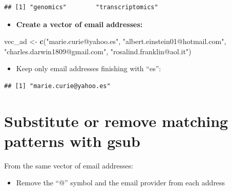 \documentclass[]{book}
\newenvironment{Shaded}{\begin{snugshade}}{\end{snugshade}}
\newcommand{\DataTypeTok}[1]{\textcolor[rgb]{0.13,0.29,0.53}{#1}}
\newcommand{\KeywordTok}[1]{\textcolor[rgb]{0.13,0.29,0.53}{\textbf{#1}}}
\newcommand{\NormalTok}[1]{#1}
\newcommand{\OtherTok}[1]{\textcolor[rgb]{0.56,0.35,0.01}{#1}}
\newcommand{\StringTok}[1]{\textcolor[rgb]{0.31,0.60,0.02}{#1}}
\providecommand{\tightlist}{%
  \setlength{\itemsep}{0pt}\setlength{\parskip}{0pt}}
\begin{document}
\begin{verbatim}
## [1] "genomics"        "transcriptomics"
\end{verbatim}

\begin{itemize}
\tightlist
\item
  \textbf{Create a vector of email addresses:}
\end{itemize}

\begin{Shaded}
\begin{Highlighting}[]
\NormalTok{vec_ad <-}\StringTok{ }\KeywordTok{c}\NormalTok{(}\StringTok{"marie.curie@yahoo.es"}\NormalTok{, }\StringTok{"albert.einstein01@hotmail.com"}\NormalTok{, }
    \StringTok{"charles.darwin1809@gmail.com"}\NormalTok{, }\StringTok{"rosalind.franklin@aol.it"}\NormalTok{)}
\end{Highlighting}
\end{Shaded}

\begin{itemize}
\tightlist
\item
  Keep only email addresses finishing with ``es'':
\end{itemize}

\begin{Shaded}
\end{Shaded}

\begin{verbatim}
## [1] "marie.curie@yahoo.es"
\end{verbatim}

\hypertarget{substitute-or-remove-matching-patterns-with-gsub}{%
\section{Substitute or remove matching patterns with gsub}\label{substitute-or-remove-matching-patterns-with-gsub}}

From the same vector of email addresses:

\begin{itemize}
\tightlist
\item
  Remove the ``@'' symbol and the email provider from each address
\end{itemize}
\end{document}
